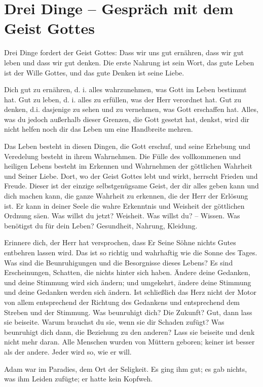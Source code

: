 
	\chapter{Drei Dinge -- Gespräch mit dem Geist Gottes}


Drei Dinge fordert der Geist Gottes: Dass wir uns gut ernähren, dass wir gut leben und dass wir gut denken. Die erste Nahrung ist sein Wort, das gute Leben ist der Wille Gottes, und das gute Denken ist seine Liebe. 

Dich gut zu ernähren, d. i. alles wahrzunehmen, was Gott im Leben bestimmt hat. Gut zu leben, d. i. alles zu erfüllen, was der Herr verordnet hat. Gut zu denken, d.i. dasjenige zu sehen und zu vernehmen, was Gott erschaffen hat. Alles, was du jedoch außerhalb dieser Grenzen, die Gott gesetzt hat, denkst, wird dir nicht helfen noch dir das Leben um eine Handbreite mehren.

Das Leben besteht in diesen Dingen, die Gott erschuf, und seine Erhebung und Veredelung besteht in ihrem Wahrnehmen. Die Fülle des vollkommenen und heiligen Lebens besteht im Erkennen und Wahrnehmen der göttlichen Wahrheit und Seiner Liebe. Dort, wo der Geist Gottes lebt und wirkt, herrscht Frieden und Freude. Dieser ist der einzige selbstgenügsame Geist, der dir alles geben kann und dich machen kann, die ganze Wahrheit zu erkennen, die der Herr der Erlösung ist. Er kann in deiner Seele die wahre Erkenntnis und Weisheit der göttlichen Ordnung säen. Was willst du jetzt? Weisheit. Was willst du? -- Wissen. Was benötigst du für dein Leben? Gesundheit, Nahrung, Kleidung. 

Erinnere dich, der Herr hat versprochen, dass Er Seine Söhne nichts Gutes entbehren lassen wird. Das ist so richtig und wahrhaftig wie die Sonne des Tages. Was sind die Beunruhigungen und die Besorgnisse dieses Lebens? Es sind Erscheinungen, Schatten, die nichts hinter sich haben. Ändere deine Gedanken, und deine Stimmung wird sich ändern; und umgekehrt, ändere deine Stimmung und deine Gedanken werden sich ändern. Ist schließlich das Herz nicht der Motor von allem entsprechend der Richtung des Gedankens und entsprechend dem Streben und der Stimmung. Was beunruhigt dich? Die Zukunft? Gut, dann lass sie beiseite. Warum brauchst du sie, wenn sie dir Schaden zufügt? Was beunruhigt dich dann, die Beziehung zu den anderen? Lass sie beiseite und denk nicht mehr daran. Alle Menschen wurden von Müttern geboren; keiner ist besser als der andere. Jeder wird so, wie er will.

Adam war im Paradies, dem Ort der Seligkeit. Es ging ihm gut; es gab nichts, was ihm Leiden zufügte; er hatte kein Kopfweh.

